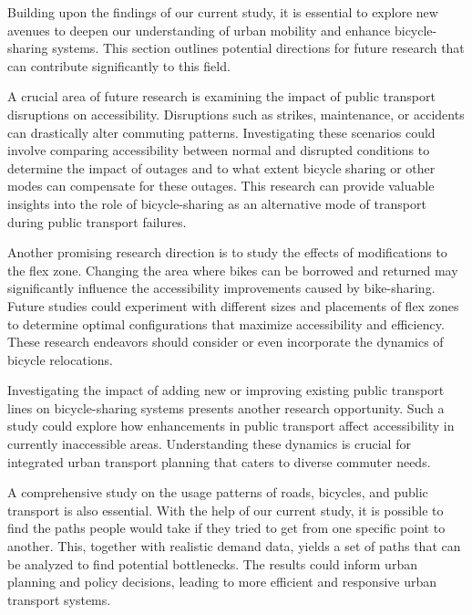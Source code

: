 Building upon the findings of our current study, it is essential to explore new avenues to deepen our understanding of urban mobility and enhance bicycle-sharing systems. 
This section outlines potential directions for future research that can contribute significantly to this field.

A crucial area of future research is examining the impact of public transport disruptions on accessibility.
Disruptions such as strikes, maintenance, or accidents can drastically alter commuting patterns. 
Investigating these scenarios could involve comparing accessibility between normal and disrupted conditions to determine the impact of outages and to what extent bicycle sharing or other modes can compensate for these outages.
This research can provide valuable insights into the role of bicycle-sharing as an alternative mode of transport during public transport failures.

Another promising research direction is to study the effects of modifications to the flex zone. 
Changing the area where bikes can be borrowed and returned may significantly influence the accessibility improvements caused by bike-sharing. 
Future studies could experiment with different sizes and placements of flex zones to determine optimal configurations that maximize accessibility and efficiency.
These research endeavors should consider or even incorporate the dynamics of bicycle relocations.

Investigating the impact of adding new or improving existing public transport lines on bicycle-sharing systems presents another research opportunity. 
Such a study could explore how enhancements in public transport affect accessibility in currently inaccessible areas.
Understanding these dynamics is crucial for integrated urban transport planning that caters to diverse commuter needs.

A comprehensive study on the usage patterns of roads, bicycles, and public transport is also essential. 
With the help of our current study, it is possible to find the paths people would take if they tried to get from one specific point to another.
This, together with realistic demand data, yields a set of paths that can be analyzed to find potential bottlenecks.
The results could inform urban planning and policy decisions, leading to more efficient and responsive urban transport systems.

